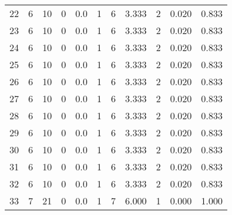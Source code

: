 \begin{tabular}{lrrrrrrrrrr}
22 &        6 &       10 &                 0 &               0.0 &                       1 &                          6 &       3.333 &              2 &       0.020 &             0.833 \\
23 &        6 &       10 &                 0 &               0.0 &                       1 &                          6 &       3.333 &              2 &       0.020 &             0.833 \\
24 &        6 &       10 &                 0 &               0.0 &                       1 &                          6 &       3.333 &              2 &       0.020 &             0.833 \\
25 &        6 &       10 &                 0 &               0.0 &                       1 &                          6 &       3.333 &              2 &       0.020 &             0.833 \\
26 &        6 &       10 &                 0 &               0.0 &                       1 &                          6 &       3.333 &              2 &       0.020 &             0.833 \\
27 &        6 &       10 &                 0 &               0.0 &                       1 &                          6 &       3.333 &              2 &       0.020 &             0.833 \\
28 &        6 &       10 &                 0 &               0.0 &                       1 &                          6 &       3.333 &              2 &       0.020 &             0.833 \\
29 &        6 &       10 &                 0 &               0.0 &                       1 &                          6 &       3.333 &              2 &       0.020 &             0.833 \\
30 &        6 &       10 &                 0 &               0.0 &                       1 &                          6 &       3.333 &              2 &       0.020 &             0.833 \\
31 &        6 &       10 &                 0 &               0.0 &                       1 &                          6 &       3.333 &              2 &       0.020 &             0.833 \\
32 &        6 &       10 &                 0 &               0.0 &                       1 &                          6 &       3.333 &              2 &       0.020 &             0.833 \\
33 &        7 &       21 &                 0 &               0.0 &                       1 &                          7 &       6.000 &              1 &       0.000 &             1.000 \\

\end{tabular}

